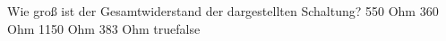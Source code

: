     {Wie groß ist der Gesamtwiderstand der dargestellten Schaltung?}
    {550 Ohm}
    {360 Ohm}
    {1150 Ohm}
    {383 Ohm}
    {true}{false}